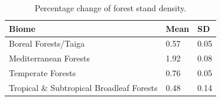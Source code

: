 \begin{table}[ht]
\centering
\begin{tabular}{lll}
  \hline
Biome & Mean & SD \\ 
  \hline
Boreal Forests/Taiga & 0.57 & 0.05 \\ 
  Mediterranean Forests & 1.92 & 0.08 \\ 
  Temperate Forests & 0.76 & 0.05 \\ 
  Tropical \& Subtropical Broadleaf Forests & 0.48 & 0.14 \\ 
  \end{tabular}
\caption{Percentage change of forest stand density.} 
\end{table}
